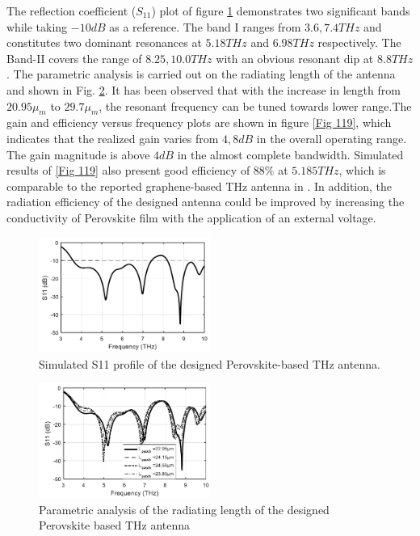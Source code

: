 \documentclass[12pt]{suhbook}
\begin{document}
The reflection coefficient ($S_{11}$) plot of figure \ref{Fig 17} demonstrates two significant bands while taking $-10 dB$ as a reference. The band I ranges from $3.6,7.4 THz$ and constitutes two dominant resonances at $5.18 THz$ and $6.98 THz$ respectively. The Band-II covers the range of $8.25, 10.0 THz$ with an obvious resonant dip at $8.8 THz$. The parametric analysis is carried out on the radiating length of the antenna and shown in Fig. \ref{Fig 18}. It has been observed that with the increase in length from $20.95 \mu_m$ to $29.7 \mu_m$, the resonant frequency can be tuned towards lower range.The gain and efficiency versus frequency plots are shown in figure \ref{Fig 119}, which indicates that the realized gain varies from $4,8 dB$ in the overall operating range. The gain magnitude is above $4 dB$ in the almost complete bandwidth. Simulated results of \ref{Fig 119} also present good efficiency of $88\%$ at $5.185 THz$, which is comparable to the reported graphene-based THz antenna in \cite{dashti2018graphene}. In addition, the radiation efficiency of the designed antenna could be improved by increasing the conductivity of Perovskite film with the application of an external voltage.\\
\begin{figure}[hbt!]
\centering
\includegraphics[width=0.5\textwidth]{17}
\caption{Simulated S11 profile of the designed Perovskite-based THz antenna.}
\label{Fig 17}
\end{figure}
\begin{figure}[hbt!]
\centering
\includegraphics[width=0.5\textwidth]{18}
\caption{Parametric analysis of the radiating length of the designed Perovskite based THz antenna}
\label{Fig 18}
\end{figure}
\end{document}
